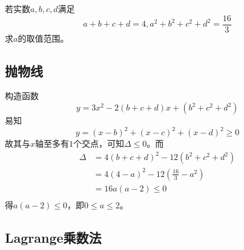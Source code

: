 

若实数$a, b, c, d$满足
\[ a + b + c + d = 4, a^2 + b^2 + c^2 + d^2 = \frac{16}3 \]
求$a$的取值范围。


\subsection{抛物线}

构造函数
\[ y = 3x^2 - 2(b + c + d)x + (b^2 + c^2 + d^2) \]
易知
\[ y = (x - b)^2 + (x - c)^2 + (x - d)^2 \ge0 \]
故其与$x$轴至多有$1$个交点，可知$\Delta \le0$。而
\begin{align*}
  \Delta &= 4(b + c + d)^2 - 12(b^2 + c^2 + d^2) \\
  &= 4(4 - a)^2 - 12\left(\frac{16}3 - a^2\right) \\
  &= 16a(a - 2) \le0 \\
\end{align*}
得$a(a - 2) \le 0$，即$0 \le a \le2$。

\subsection{Lagrange乘数法}

